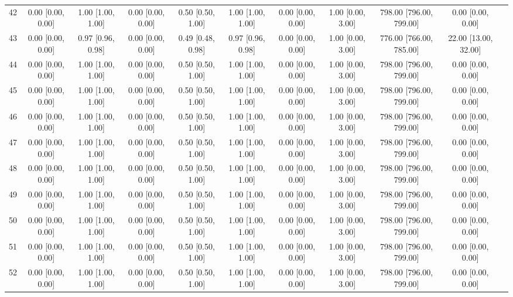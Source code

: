 \documentclass[8pt]{article}
\begin{document}
\begin{center}
\begin{footnotesize}
\begin{longtable}{|ccccccccccc|}
 42 &  0.00 [0.00, 0.00] &  1.00 [1.00, 1.00] &  0.00 [0.00, 0.00] &  0.50 [0.50, 1.00] &  1.00 [1.00, 1.00] &  0.00 [0.00, 0.00] &  1.00 [0.00, 3.00] &  798.00 [796.00, 799.00] &       0.00 [0.00, 0.00] \\
 43 &  0.00 [0.00, 0.00] &  0.97 [0.96, 0.98] &  0.00 [0.00, 0.00] &  0.49 [0.48, 0.98] &  0.97 [0.96, 0.98] &  0.00 [0.00, 0.00] &  1.00 [0.00, 3.00] &  776.00 [766.00, 785.00] &    22.00 [13.00, 32.00] \\
 44 &  0.00 [0.00, 0.00] &  1.00 [1.00, 1.00] &  0.00 [0.00, 0.00] &  0.50 [0.50, 1.00] &  1.00 [1.00, 1.00] &  0.00 [0.00, 0.00] &  1.00 [0.00, 3.00] &  798.00 [796.00, 799.00] &       0.00 [0.00, 0.00] \\
 45 &  0.00 [0.00, 0.00] &  1.00 [1.00, 1.00] &  0.00 [0.00, 0.00] &  0.50 [0.50, 1.00] &  1.00 [1.00, 1.00] &  0.00 [0.00, 0.00] &  1.00 [0.00, 3.00] &  798.00 [796.00, 799.00] &       0.00 [0.00, 0.00] \\
 46 &  0.00 [0.00, 0.00] &  1.00 [1.00, 1.00] &  0.00 [0.00, 0.00] &  0.50 [0.50, 1.00] &  1.00 [1.00, 1.00] &  0.00 [0.00, 0.00] &  1.00 [0.00, 3.00] &  798.00 [796.00, 799.00] &       0.00 [0.00, 0.00] \\
 47 &  0.00 [0.00, 0.00] &  1.00 [1.00, 1.00] &  0.00 [0.00, 0.00] &  0.50 [0.50, 1.00] &  1.00 [1.00, 1.00] &  0.00 [0.00, 0.00] &  1.00 [0.00, 3.00] &  798.00 [796.00, 799.00] &       0.00 [0.00, 0.00] \\
 48 &  0.00 [0.00, 0.00] &  1.00 [1.00, 1.00] &  0.00 [0.00, 0.00] &  0.50 [0.50, 1.00] &  1.00 [1.00, 1.00] &  0.00 [0.00, 0.00] &  1.00 [0.00, 3.00] &  798.00 [796.00, 799.00] &       0.00 [0.00, 0.00] \\
 49 &  0.00 [0.00, 0.00] &  1.00 [1.00, 1.00] &  0.00 [0.00, 0.00] &  0.50 [0.50, 1.00] &  1.00 [1.00, 1.00] &  0.00 [0.00, 0.00] &  1.00 [0.00, 3.00] &  798.00 [796.00, 799.00] &       0.00 [0.00, 0.00] \\
 50 &  0.00 [0.00, 0.00] &  1.00 [1.00, 1.00] &  0.00 [0.00, 0.00] &  0.50 [0.50, 1.00] &  1.00 [1.00, 1.00] &  0.00 [0.00, 0.00] &  1.00 [0.00, 3.00] &  798.00 [796.00, 799.00] &       0.00 [0.00, 0.00] \\
 51 &  0.00 [0.00, 0.00] &  1.00 [1.00, 1.00] &  0.00 [0.00, 0.00] &  0.50 [0.50, 1.00] &  1.00 [1.00, 1.00] &  0.00 [0.00, 0.00] &  1.00 [0.00, 3.00] &  798.00 [796.00, 799.00] &       0.00 [0.00, 0.00] \\
 52 &  0.00 [0.00, 0.00] &  1.00 [1.00, 1.00] &  0.00 [0.00, 0.00] &  0.50 [0.50, 1.00] &  1.00 [1.00, 1.00] &  0.00 [0.00, 0.00] &  1.00 [0.00, 3.00] &  798.00 [796.00, 799.00] &       0.00 [0.00, 0.00] \\

\end{longtable}
\end{footnotesize}
\end{center}
\end{document}
